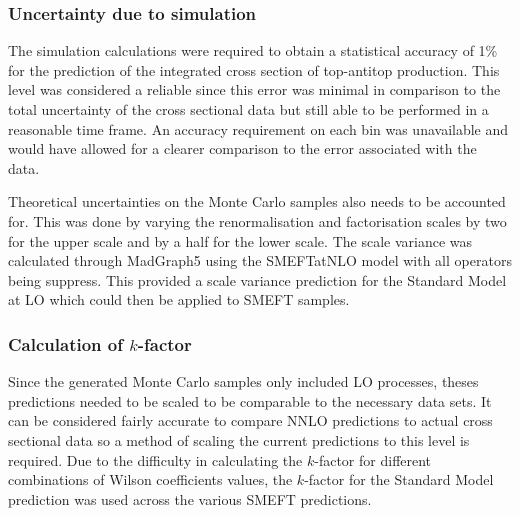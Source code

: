 \documentclass[a4paper,11pt]{article}
\begin{document}
\subsubsection{Uncertainty due to simulation}

The simulation calculations were required to obtain a statistical accuracy of 1\% for the prediction of the integrated cross section of top-antitop production.
This level was considered a reliable since this error was minimal in comparison to the total uncertainty of the cross sectional data but still able to be performed in a reasonable time frame.
An accuracy requirement on each bin was unavailable and would have allowed for a clearer comparison to the error associated with the data.

Theoretical uncertainties on the Monte Carlo samples also needs to be accounted for.
This was done by varying the renormalisation and factorisation scales by two for the upper scale and by a half for the lower scale.
The scale variance was calculated through MadGraph5 using the SMEFTatNLO model with all operators being suppress.
This provided a scale variance prediction for the Standard Model at LO which could then be applied to SMEFT samples.

\subsubsection{Calculation of \texorpdfstring{$k$}{k}-factor}
Since the generated Monte Carlo samples only included LO processes, theses predictions needed to be scaled to be comparable to the necessary data sets.
It can be considered fairly accurate to compare NNLO predictions to actual cross sectional data so a method of scaling the current predictions to this level is required.
Due to the difficulty in calculating the $k$-factor for different combinations of Wilson coefficients values, the $k$-factor for the Standard Model prediction was used across the various SMEFT predictions.
\end{document}

